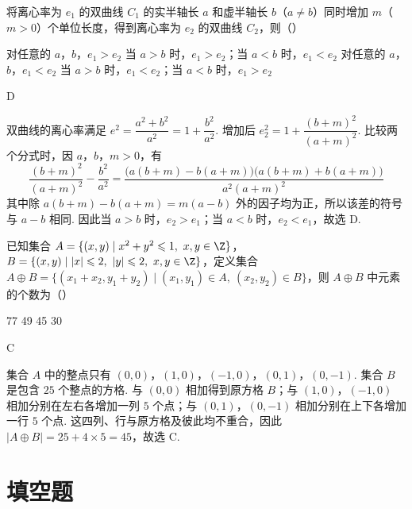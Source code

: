\begin{problem}
将离心率为 \(e_1\) 的双曲线 \(C_1\) 的实半轴长 \(a\) 和虚半轴长 \(b\)（\(a\neq b\)）同时增加 \(m\)（\(m>0\)）个单位长度，得到离心率为 \(e_2\) 的双曲线 \(C_2\)，则（\quad）

\choices
    {对任意的 \(a\)，\(b\)，\(e_1>e_2\)}
    {当 \(a>b\) 时，\(e_1>e_2\)；当 \(a<b\) 时，\(e_1<e_2\)}
    {对任意的 \(a\)，\(b\)，\(e_1<e_2\)}
    {当 \(a>b\) 时，\(e_1<e_2\)；当 \(a<b\) 时，\(e_1>e_2\)}
\end{problem}

\begin{answer}
D
\end{answer}

\begin{solution}
双曲线的离心率满足 \(e^2=\dfrac{a^2+b^2}{a^2}=1+\dfrac{b^2}{a^2}\). 增加后
\(e_2^2=1+\dfrac{(b+m)^2}{(a+m)^2}\). 比较两个分式时，因 \(a\)，\(b\)，\(m>0\)，有
\[
\frac{(b+m)^2}{(a+m)^2}-\frac{b^2}{a^2}
=\frac{\bigl(a(b+m)-b(a+m)\bigr)\bigl(a(b+m)+b(a+m)\bigr)}{a^2(a+m)^2}
\]
其中除 \(a(b+m)-b(a+m)=m(a-b)\) 外的因子均为正，所以该差的符号与 \(a-b\) 相同. 因此当 \(a>b\) 时，\(e_2>e_1\)；当 \(a<b\) 时，\(e_2<e_1\)，故选 D.
\end{solution}

\begin{problem}
已知集合 \(A=\{(x,y)\mid x^2+y^2\leqslant 1,\ x,y\in\Z\}\)，\(B=\{(x,y)\mid |x|\leqslant 2,\ |y|\leqslant 2,\ x,y\in\Z\}\)，定义集合 \(A\oplus B=\{(x_1+x_2,y_1+y_2)\mid (x_1,y_1)\in A,\ (x_2,y_2)\in B\}\)，则 \(A\oplus B\) 中元素的个数为（\quad）

\choices
    {77}
    {49}
    {45}
    {30}
\end{problem}

\begin{answer}
C
\end{answer}

\begin{solution}
集合 \(A\) 中的整点只有 \((0,0)\)，\((1,0)\)，\((-1,0)\)，\((0,1)\)，\((0,-1)\). 集合 \(B\) 是包含 \(25\) 个整点的方格. 与 \((0,0)\) 相加得到原方格 \(B\)；与 \((1,0)\)，\((-1,0)\) 相加分别在左右各增加一列 \(5\) 个点；与 \((0,1)\)，\((0,-1)\) 相加分别在上下各增加一行 \(5\) 个点. 这四列、行与原方格及彼此均不重合，因此
\(\lvert A\oplus B\rvert=25+4\times5=45\)，故选 C.
\end{solution}

\section{填空题}

